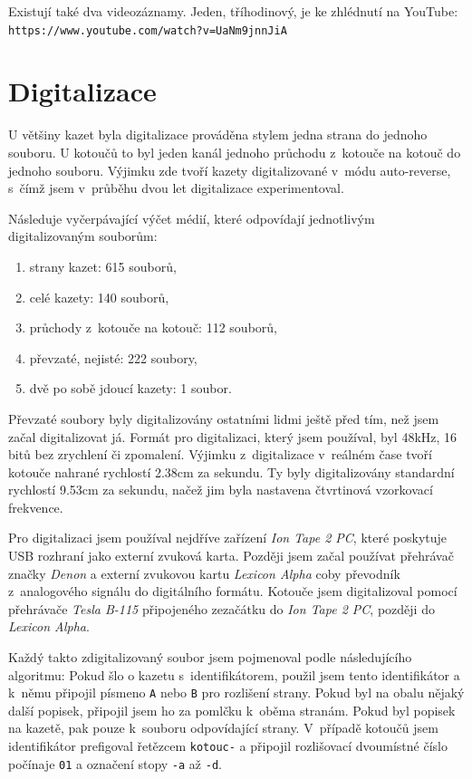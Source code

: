 Existují také dva videozáznamy. Jeden, tříhodinový, je ke zhlédnutí na YouTube:
\texttt{https://www.youtube.com/watch?v=UaNm9jnnJiA}

\section{Digitalizace}

U většiny kazet byla digitalizace prováděna stylem jedna strana do jednoho
souboru. U kotoučů to byl jeden kanál jednoho průchodu z~kotouče na kotouč do
jednoho souboru. Výjimku zde tvoří kazety digitalizované v~módu auto-reverse,
s~čímž jsem v~průběhu dvou let digitalizace experimentoval.

Následuje vyčerpávající výčet médií, které odpovídají jednotlivým
digitalizovaným souborům:

\begin{enumerate}
\item{strany kazet: 615 souborů,}
\item{celé kazety: 140 souborů,}
\item{průchody z~kotouče na kotouč: 112 souborů,}
\item{převzaté, nejisté: 222 soubory,}
\item{dvě po sobě jdoucí kazety: 1 soubor.}
\end{enumerate}

Převzaté soubory byly digitalizovány ostatními lidmi ještě před tím, než jsem
začal digitalizovat já. Formát pro digitalizaci, který jsem používal, byl 48kHz,
16 bitů bez zrychlení či zpomalení. Výjimku z~digitalizace v~reálném čase tvoří
kotouče nahrané rychlostí 2.38cm za sekundu. Ty byly digitalizovány standardní
rychlostí 9.53cm za sekundu, načež jim byla nastavena čtvrtinová vzorkovací
frekvence.

Pro digitalizaci jsem používal nejdříve zařízení {\em Ion Tape 2 PC}, které
poskytuje USB rozhraní jako externí zvuková karta. Později jsem začal používat
přehrávač značky {\em Denon} a externí zvukovou kartu {\em Lexicon Alpha} coby převodník
z~analogového signálu do digitálního formátu. Kotouče jsem digitalizoval pomocí
přehrávače {\em Tesla B-115} připojeného zezačátku do {\em Ion Tape 2 PC},
později do {\em Lexicon Alpha}.

Každý takto zdigitalizovaný soubor jsem pojmenoval podle následujícího
algoritmu: Pokud šlo o kazetu s~identifikátorem, použil jsem tento identifikátor
a k~němu připojil písmeno \texttt{A} nebo \texttt{B} pro rozlišení strany. Pokud
byl na obalu nějaký další popisek, připojil jsem ho za pomlčku k~oběma stranám.
Pokud byl popisek na kazetě, pak pouze k~souboru odpovídající strany. V~případě
kotoučů jsem identifikátor prefigoval řetězcem \texttt{kotouc-} a připojil
rozlišovací dvoumístné číslo počínaje \texttt{01} a označení stopy \texttt{-a}
až \texttt{-d}.

